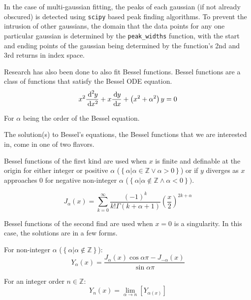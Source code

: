 \documentclass[twocolumn]{article}
\begin{document}
In the case of multi-gaussian fitting, the peaks of each gaussian (if not already obscured) is detected using \texttt{scipy} based peak finding algorithms. To prevent the intrusion of other gaussians, the domain that the data points for any one particular gaussian is determined by the \texttt{peak\_widths} function, with the start and ending points of the gaussian being determined by the function's 2nd and 3rd returns in index space.

Research has also been done to also fit Bessel functions. Bessel functions are a class of functions that satisfy the Bessel ODE equation.
\begin{equation}
	x^2 \frac{\diff[2]{y}}{\diff{x^2}} + x \frac{\diff{y}}{\diff{x}} + \left( x^2 + \alpha^2 \right) y = 0
	\label{eq:Bessel_ODE_equation}
\end{equation}

For $\alpha$ being the order of the Bessel equation. 

The solution(s) to Bessel's equations, the Bessel functions that we are interested in, come in one of two flavors. 

Bessel functions of the first kind are used when $x$ is finite and definable at the origin for either integer or positive $\alpha$ ($\left\{ \left. \alpha \right| \alpha \in \mathbb{Z} \lor \alpha > 0 \right\}$) or if $y$ diverges as $x$ approaches $0$ for negative non-integer $\alpha$ ($\left\{ \left. \alpha \right| \alpha \notin \mathbb{Z} \land \alpha < 0\right\})$.

\begin{equation}
	J_{\alpha}(x) = \sum_{k=0}^{\infty} \frac{\left(-1\right)^{k}}{k! \Gamma(k+\alpha+1)} \left( \frac{x}{2} \right)^{2k + \alpha}
	\label{eq:Bessel_equation_firstkind}
\end{equation}

Bessel functions of the second find are used when $x=0$ is a singularity. In this case, the solutions are in a few forms.

For non-integer $\alpha$ ($\left\{ \left. \alpha \right| \alpha \notin \mathbb{Z} \right\}$):
\begin{equation}
	Y_{\alpha}(x) = \frac{J_{\alpha}(x) \cos{\alpha \pi} - J_{-\alpha}(x)}{\sin{\alpha\pi}}
	\label{eq:Bessel_equation_secondkind_noninterger}
\end{equation}

For an integer order $n \in \mathbb{Z}$:
\begin{equation}
	Y_{n}(x) = \lim_{\alpha \rightarrow n} \left[ {Y_{\alpha(x)}} \right]
	\label{eq:Bessel_equation_secondkind_interger}
\end{equation}
\end{document}
